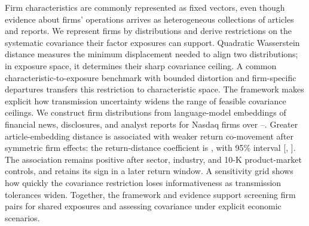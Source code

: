 Firm characteristics are commonly represented as fixed vectors, even though
evidence about firms' operations arrives as heterogeneous collections of
articles and reports.
We represent firms by distributions and derive restrictions on the systematic
covariance their factor exposures can support.
Quadratic Wasserstein distance measures the minimum displacement needed to
align two distributions; in exposure space, it determines their sharp
covariance ceiling.
A common characteristic-to-exposure benchmark with bounded distortion and
firm-specific departures transfers this restriction to characteristic space.
The framework makes explicit how transmission uncertainty widens the range
of feasible covariance ceilings.
We construct firm distributions from language-model embeddings of financial
news, disclosures, and analyst reports for Nasdaq firms over
--.
Greater article-embedding distance is associated with weaker return
co-movement after symmetric firm effects: the return-distance coefficient is
, with 95\% interval
[, ].
The association remains positive after sector, industry, and 10-K
product-market controls, and retains its sign in a later return window.
A sensitivity grid shows how quickly the covariance restriction loses
informativeness as transmission tolerances widen.
Together, the framework and evidence support screening firm pairs for shared
exposures and assessing covariance under explicit economic scenarios.
